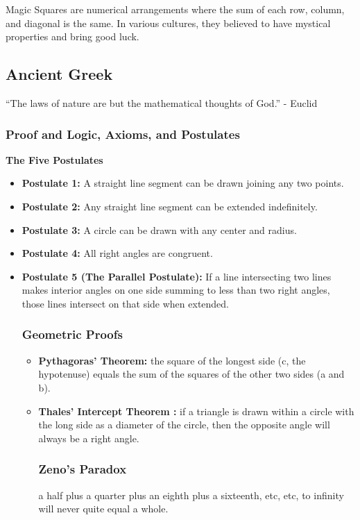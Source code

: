 \documentclass[11.6pt]{article}
\begin{document}
Magic Squares are numerical arrangements where the sum of each row, column, and diagonal is the same. In various cultures, they believed to have mystical properties and bring good luck.



\newpage
\subsection{Ancient Greek}
“The laws of nature are but the mathematical thoughts of God.” - Euclid

\subsubsection{Proof and Logic, Axioms, and Postulates
}
\textbf{The Five Postulates}
\begin{itemize}
    \item \textbf{Postulate 1: }  A straight line segment can be drawn joining any two points.

    \item \textbf{Postulate 2: }Any straight line segment can be extended indefinitely.

    \item \textbf{Postulate 3:}  A circle can be drawn with any center and radius.

    \item \textbf{Postulate 4: }   All right angles are congruent.

    \item \textbf{Postulate 5 (The Parallel Postulate):} If a line intersecting two lines makes interior angles on one side summing to less than two right angles, those lines intersect on that side when extended.

\subsubsection{Geometric Proofs
}
\begin{itemize}
    \item \textbf{Pythagoras’ Theorem: 
} the square of the longest side (c, the hypotenuse) equals the sum of the squares of the other two sides (a and b).

\item \textbf{Thales’ Intercept Theorem
: }  if a triangle is drawn within a circle with the long side as a diameter of the circle, then the opposite angle will always be a right angle.

\subsubsection{Zeno's Paradox}
a half plus a quarter plus an eighth plus a sixteenth, etc, etc, to infinity will never quite equal a whole. 




\end{itemize}



    

\end{itemize}
\end{document}
